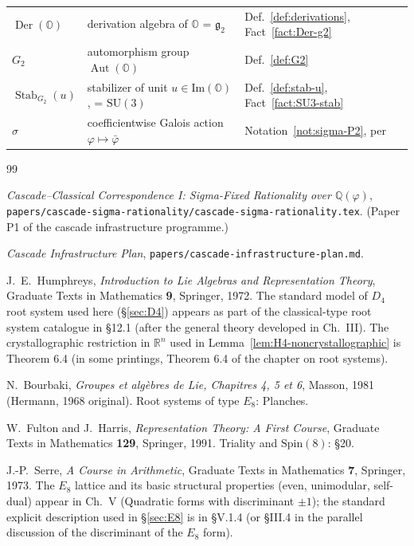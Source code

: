 \documentclass[11pt, a4paper]{amsart}
\theoremstyle{definition}
\newcommand{\R}{\mathbb{R}}
\newcommand{\Q}{\mathbb{Q}}
\newcommand{\OO}{\mathbb{O}}
\newcommand{\Der}{\operatorname{Der}}
\newcommand{\Aut}{\operatorname{Aut}}
\newcommand{\Stab}{\operatorname{Stab}}
\newcommand{\Spin}{\mathrm{Spin}}
\newcommand{\SU}{\mathrm{SU}}
\renewcommand{\Im}{\mathrm{Im}}
\begin{document}
\begin{center}
\begin{tabular}{lll}
$\Der(\OO)$ & derivation algebra of $\OO$ = $\mathfrak{g}_2$ & Def.~\ref{def:derivations}, Fact~\ref{fact:Der-g2} \\
$G_2$ & automorphism group $\Aut(\OO)$ & Def.~\ref{def:G2} \\
$\Stab_{G_2}(u)$ & stabilizer of unit $u \in \Im(\OO)$, = $\SU(3)$ & Def.~\ref{def:stab-u}, Fact~\ref{fact:SU3-stab} \\
$\sigma$ & coefficientwise Galois action $\varphi \mapsto \bar\varphi$ & Notation~\ref{not:sigma-P2}, per \cite{SigmaRationality} \\
\hline
\end{tabular}
\end{center}

\begin{thebibliography}{99}

\emph{Cascade--Classical Correspondence I: Sigma-Fixed Rationality
over $\Q(\varphi)$},
\texttt{papers/cascade-sigma-rationality/cascade-sigma-rationality.tex}.
(Paper P1 of the cascade infrastructure programme.)

\emph{Cascade Infrastructure Plan},
\texttt{papers/cascade-infrastructure-plan.md}.

J.~E.~Humphreys, \emph{Introduction to Lie Algebras and
Representation Theory}, Graduate Texts in Mathematics \textbf{9},
Springer, 1972. The standard model of $D_4$ root system used here
(\S\ref{sec:D4}) appears as part of the classical-type root system
catalogue in \S 12.1 (after the general theory developed in
Ch.~III). The crystallographic restriction in $\R^n$ used in
Lemma~\ref{lem:H4-noncrystallographic} is Theorem 6.4 (in some
printings, Theorem 6.4 of the chapter on root systems).

N.~Bourbaki, \emph{Groupes et alg\`ebres de Lie, Chapitres 4, 5 et
6}, Masson, 1981 (Hermann, 1968 original). Root systems of type
$E_8$: Planches.

W.~Fulton and J.~Harris, \emph{Representation Theory: A First
Course}, Graduate Texts in Mathematics \textbf{129}, Springer,
1991. Triality and $\Spin(8)$: \S 20.

J.-P.~Serre, \emph{A Course in Arithmetic}, Graduate Texts in
Mathematics \textbf{7}, Springer, 1973. The $E_8$ lattice and its
basic structural properties (even, unimodular, self-dual) appear in
Ch.~V (Quadratic forms with discriminant $\pm 1$); the standard
explicit description used in \S\ref{sec:E8} is in \S V.1.4 (or
\S III.4 in the parallel discussion of the discriminant of the
$E_8$ form).


\end{thebibliography}
\end{document}
